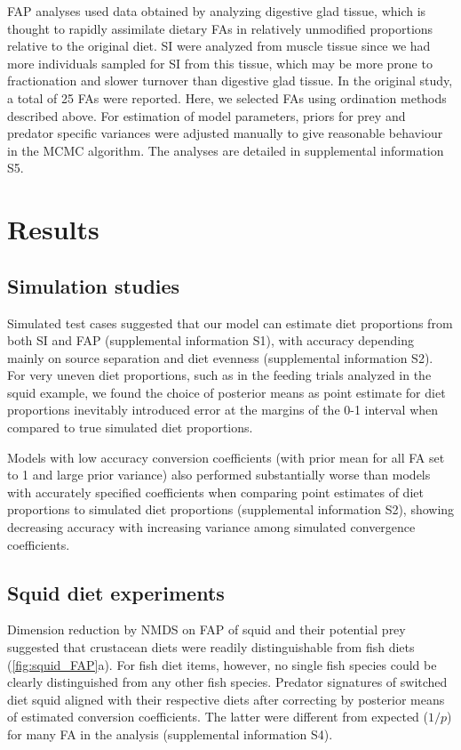 \documentclass{article}%
\begin{document}
\begin{spacing}{1.9}
\begin{flushleft}
FAP analyses used data obtained by analyzing digestive glad tissue, which is thought to
rapidly assimilate dietary FAs in relatively unmodified
proportions relative to the original diet. SI were analyzed from
muscle tissue since we had more individuals sampled for SI from this tissue, which may be more prone to fractionation and slower
turnover than digestive glad tissue. In the original study, a total of
25 FAs were reported. Here, we selected FAs using ordination
methods described above. For estimation of model parameters, priors for
prey and predator specific variances were adjusted manually to give
reasonable behaviour in the MCMC algorithm. The analyses are detailed
in supplemental information S5.

\section{Results}

\subsection{Simulation studies}
Simulated test cases suggested that our model can estimate diet
proportions from both SI and FAP (supplemental information S1), with
accuracy depending mainly on source separation and diet evenness (supplemental information S2). For very
uneven diet proportions, such as in the feeding trials analyzed in the
squid example, we found the choice of posterior means as point estimate for diet
proportions inevitably introduced error at the margins of
the 0-1 interval when compared to true simulated diet
proportions.

Models with low accuracy conversion coefficients (with prior mean for
all FA set to 1 and large prior variance) also performed substantially
worse than models with accurately specified coefficients when
comparing point estimates of diet proportions to simulated diet
proportions (supplemental information S2), showing decreasing accuracy with increasing variance among simulated convergence coefficients.

\subsection{Squid diet experiments}

Dimension reduction by NMDS on FAP of squid and their potential prey suggested that crustacean diets were
readily distinguishable from fish diets
(\autoref{fig:squid_FAP}a). For fish diet items, however, no single
fish species could be clearly distinguished from any other fish species. Predator signatures of switched diet squid aligned with their
respective diets after correcting by posterior means of estimated conversion
coefficients. The latter were different from expected ($1/p$) for many
FA in the analysis (supplemental information S4).



\end{flushleft}
\end{spacing}
\end{document}
